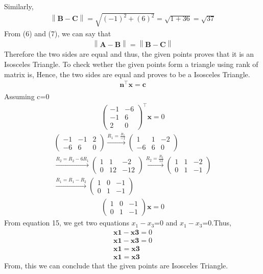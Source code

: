 \documentclass[12pt]{article}
\providecommand{\norm}[1]{\left\lVert#1\right\rVert}
\newcommand{\myvec}[1]{\ensuremath{\begin{pmatrix}#1\end{pmatrix}}}
\let\vec\mathbf
\begin{document}
\begin{enumerate}
\begin{align}
	\end{align}  
	Similarly,
	\begin{align}
		\norm{\vec{B}-\vec{C}} = \sqrt{(-1)^2+(6)^2} = \sqrt{1+36} = \sqrt{37}
\end{align}	  	
From (6) and (7), we can say that
	\begin{align}
		\norm{\vec{A}-\vec{B}} = \norm{\vec{B}-\vec{C}}
	\end{align}
Therefore the two sides are equal and thus, the given points proves that it is an Isosceles Triangle.
To check wether the given points form a triangle using rank of matrix is,
Hence, the two sides are equal and proves to be a Isosceles Triangle.
\begin{align} 
 \vec{n}^\top\vec{x}=\vec{c} \\
\end{align}
Assuming c=0
\begin{align}
\myvec{
-1 & -6
\\
-1 & 6
\\
2 & 0
}^\top\vec{x}=0 
\end{align}
\begin{align}
\myvec{
-1 & -1 & 2
\\
-6 & 6 & 0
}
\xrightarrow[]{R_1=\frac{R_1}{-1}}
\myvec{
1 & 1 & -2
\\
-6 & 6 & 0                 
}	  
\\
\xrightarrow[]{R_2=R_2-6R_1}
\myvec{
1 & 1 & -2
\\
0 & 12 & -12
}
\xrightarrow[]{R_2=\frac{R_2}{12}}
\myvec{
1 & 1 & -2
\\
0 & 1 & -1
}\\
\xrightarrow[]{R_1=R_1-R_2}
\myvec{
1 & 0 & -1
\\
0 & 1 & -1}
\end{align}
\begin{align}
\myvec{
1 & 0 & -1
\\
0 & 1 & -1}\vec{x}=0
\end{align}
From equation 15, we get two equations $x_1-x_3$=0 and $x_1-x_3$=0.Thus,
\begin{align}
\vec{x1}-\vec{x3}=0 \\
\vec{x1}-\vec{x3}=0 \\
\vec{x1}=\vec{x3} \\
\vec{x1}=\vec{x3}
\end{align}
From, this we can conclude that the given points are Isosceles Triangle.
\begin{figure}[!h]
	\begin{center} 

\end{center}
\end{figure}
\end{enumerate}
\end{document}
